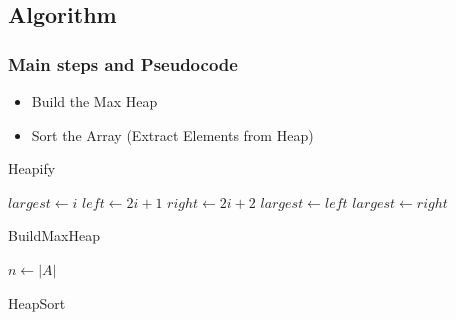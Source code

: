 \subsection{Algorithm}

\subsubsection{Main steps and Pseudocode}
\begin{itemize}
    \item Build the Max Heap
    \item Sort the Array (Extract Elements from Heap)
\end{itemize}

\begin{algorithm}
    \caption{Heapify}
    \begin{algorithmic}[1]
        \State $largest \gets i$
        \State $left \gets 2i + 1$
        \State $right \gets 2i + 2$
        \State $largest \gets left$
        \EndIf
        \State $largest \gets right$
        \EndIf
        \State {}
        \State {}
        \EndIf
        \EndFunction
    \end{algorithmic}
\end{algorithm}

\begin{algorithm}
    \caption{BuildMaxHeap}
    \begin{algorithmic}[1]
        \State $n \gets |A|$
        \State {}
        \EndFor
        \EndFunction
    \end{algorithmic}
\end{algorithm}

\begin{algorithm}
    \caption{HeapSort}
    \begin{algorithmic}[1]
        \State {}
        \State {}
        \State {}
        \EndFor
        \EndFunction
    \end{algorithmic}
\end{algorithm}

